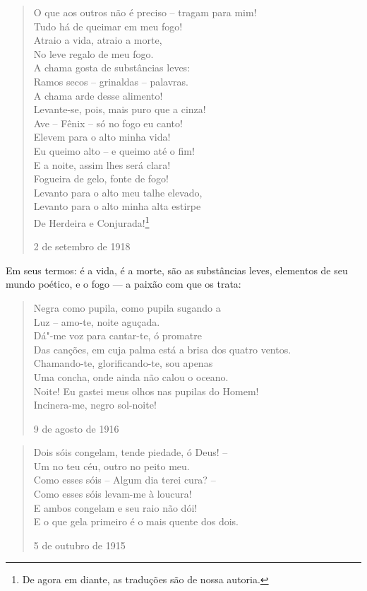 \begin{verse}
O que aos outros não é preciso -- tragam \qb{}para mim! \\
Tudo há de queimar em meu fogo! \\
Atraio a vida, atraio a morte, \\
No leve regalo de meu fogo. \\[8pt]
A chama gosta de substâncias leves: \\
Ramos secos -- grinaldas -- palavras. \\
A chama arde desse alimento! \\
Levante-se, pois, mais puro que a cinza! \\[8pt]
Ave -- Fênix -- só no fogo eu canto! \\
Elevem para o alto minha vida! \\
Eu queimo alto -- e queimo até o fim! \\
E a noite, assim lhes será clara! \\[8pt]
Fogueira de gelo, fonte de fogo! \\
Levanto para o alto meu talhe elevado, \\
Levanto para o alto minha alta estirpe \\
De Herdeira e Conjurada!\footnote{De agora em diante, as traduções são
  de nossa autoria.}

2 de setembro de 1918

\end{verse}

Em seus termos: é a vida, é a morte, são as substâncias leves, elementos
de seu mundo poético, e o fogo --- a paixão com que os trata:

\begin{verse}
Negra como pupila, como pupila sugando a \\
Luz -- amo-te, noite aguçada. \\[8pt]
Dá"-me voz para cantar-te, ó promatre \\
Das canções, em cuja palma está a brisa \qb{}dos quatro ventos. \\[8pt]
Chamando-te, glorificando-te, sou apenas \\
Uma concha, onde ainda não calou o oceano. \\[8pt]
Noite! Eu gastei meus olhos nas pupilas \qb{}do Homem! \\
Incinera-me, negro sol-noite!

9 de agosto de 1916
\end{verse}

\begin{verse}
Dois sóis congelam, tende piedade, \qb{}ó Deus! -- \\
Um no teu céu, outro no peito meu. \\[8pt]
Como esses sóis -- Algum dia terei cura? -- \\
Como esses sóis levam-me à loucura! \\[8pt]
E ambos congelam e seu raio não dói! \\
E o que gela primeiro é o mais quente \qb{}dos dois.

5 de outubro de 1915

\end{verse}

